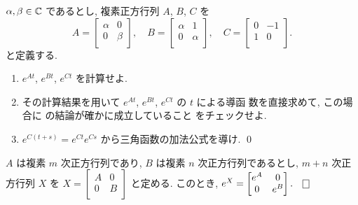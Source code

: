 \documentclass[12pt,twoside]{jarticle}
\begin{document}
\begin{question}
  $\alpha,\beta\in{\mathbb C}$ であるとし, 
  複素正方行列 $A$, $B$, $C$ を
  \begin{equation*}
    A =
    \begin{bmatrix}
      \alpha & 0 \\
      0 & \beta \\
    \end{bmatrix},
    \quad
    B =
    \begin{bmatrix}
      \alpha & 1 \\
      0 & \alpha \\
    \end{bmatrix},
    \quad
    C =
    \begin{bmatrix}
      0 & -1 \\
      1 &  0 \\
    \end{bmatrix}.
  \end{equation*}
  と定義する.
  \begin{enumerate}
  \item $e^{At}$, $e^{Bt}$, $e^{Ct}$ を計算せよ. 
  \item その計算結果を用いて $e^{At}$, $e^{Bt}$, $e^{Ct}$ の $t$ による導函
    数を直接求めて, この場合に  の結論が確かに成立していること
    をチェックせよ.
  \item $e^{C(t+s)} = e^{Ct}e^{Cs}$ から三角函数の加法公式を導け.
  \qed
  \end{enumerate}
\end{question}


\begin{question}
  $A$ は複素 $m$ 次正方行列であり, $B$ は複素 $n$ 次正方行列であるとし, %
  $m+n$ 次正方行列 $X$ を %
  \(
    X =
    \begin{bmatrix}
      A & 0 \\
      0 & B \\
    \end{bmatrix}
  \)
  と定める. このとき, %
  \(
    e^X =
    \begin{bmatrix}
      e^A & 0 \\
      0 & e^B \\
    \end{bmatrix}.
    \qed
  \)
\end{question}

\end{document}
